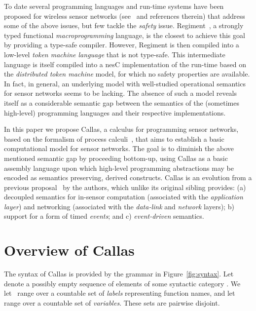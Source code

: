 \documentclass[copyright,creativecommons]{eptcs}
\begin{document}
To date several programming languages and run-time systems have been
proposed for wireless sensor networks (see~\cite{bookchapter} and
references therein) that address some of the above issues, but few
tackle the \emph{safety} issue. Regiment~\cite{regiment2}, a strongly
typed functional \emph{macroprogramming} language, is the closest to
achieve this goal by providing a type-safe compiler.
However, Regiment is then compiled into a low-level \emph{token
 machine language} that is not type-safe. This intermediate language
is itself compiled into a nesC implementation of the run-time based on
the \emph{distributed token machine} model, for which no safety
properties are available.
In fact, in general, an underlying model with well-studied operational
semantics for sensor networks seems to be lacking. The absence of such
a model reveals itself as a considerable semantic gap between the
semantics of the (sometimes high-level) programming languages and their
respective implementations.

In this paper we propose Callas, a calculus for programming sensor
networks, based on the formalism of process
calculi~\cite{async-pi:honda:tokoro:91,pi:milner:parrow:walker:92},
that aims to establish a basic computational model for sensor
networks. The goal is to diminish the above mentioned semantic gap
by proceeding bottom-up, using Callas as a basic assembly language
upon which high-level programming abstractions may be encoded as
semantics preserving, derived constructs.
Callas is an evolution from a previous proposal~\cite{sensorcomm07} by
the authors, which unlike its original sibling  provides: (a)
decoupled semantics for in-sensor computation (associated with the
\emph{application layer}) and networking (associated with the
\emph{data-link} and \emph{network} layers); b) support for a form of
timed \emph{events}; and c) \emph{event-driven} semantics.






\section{Overview of Callas}
\label{sec:calculus}

The syntax of Callas is provided by the grammar in
Figure~\ref{fig:syntax}. Let  denote a possibly empty
sequence  of elements of some syntactic
category . We let~ range over a countable set of
\emph{labels} representing function names, and let  range
over a countable set of \emph{variables}. These sets are pairwise
disjoint.
\end{document}
